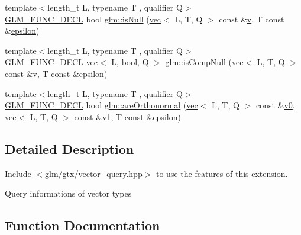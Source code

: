 \begin{DoxyCompactItemize}
\item 
{\footnotesize template$<$length\+\_\+t L, typename T , qualifier Q$>$ }\\\mbox{\hyperlink{setup_8hpp_ab2d052de21a70539923e9bcbf6e83a51}{G\+L\+M\+\_\+\+F\+U\+N\+C\+\_\+\+D\+E\+CL}} bool \mbox{\hyperlink{group__gtx__vector__query_gab4a3637dbcb4bb42dc55caea7a1e0495}{glm\+::is\+Null}} (\mbox{\hyperlink{structglm_1_1vec}{vec}}$<$ L, T, Q $>$ const \&\mbox{\hyperlink{_s_d_l__opengl_8h_a10a82eabcb59d2fcd74acee063775f90}{v}}, T const \&\mbox{\hyperlink{group__gtc__constants_ga2a1e57fc5592b69cfae84174cbfc9429}{epsilon}})
\item 
{\footnotesize template$<$length\+\_\+t L, typename T , qualifier Q$>$ }\\\mbox{\hyperlink{setup_8hpp_ab2d052de21a70539923e9bcbf6e83a51}{G\+L\+M\+\_\+\+F\+U\+N\+C\+\_\+\+D\+E\+CL}} \mbox{\hyperlink{structglm_1_1vec}{vec}}$<$ L, bool, Q $>$ \mbox{\hyperlink{group__gtx__vector__query_gaf6ec1688eab7442fe96fe4941d5d4e76}{glm\+::is\+Comp\+Null}} (\mbox{\hyperlink{structglm_1_1vec}{vec}}$<$ L, T, Q $>$ const \&\mbox{\hyperlink{_s_d_l__opengl_8h_a10a82eabcb59d2fcd74acee063775f90}{v}}, T const \&\mbox{\hyperlink{group__gtc__constants_ga2a1e57fc5592b69cfae84174cbfc9429}{epsilon}})
\item 
{\footnotesize template$<$length\+\_\+t L, typename T , qualifier Q$>$ }\\\mbox{\hyperlink{setup_8hpp_ab2d052de21a70539923e9bcbf6e83a51}{G\+L\+M\+\_\+\+F\+U\+N\+C\+\_\+\+D\+E\+CL}} bool \mbox{\hyperlink{group__gtx__vector__query_ga1b091c3d7f9ee3b0708311c001c293e3}{glm\+::are\+Orthonormal}} (\mbox{\hyperlink{structglm_1_1vec}{vec}}$<$ L, T, Q $>$ const \&\mbox{\hyperlink{_s_d_l__opengl__glext_8h_a7062a23d1d434121d4a88f530703d06a}{v0}}, \mbox{\hyperlink{structglm_1_1vec}{vec}}$<$ L, T, Q $>$ const \&\mbox{\hyperlink{_s_d_l__opengl__glext_8h_a435c176a02c061b43e19bdf7c86cceae}{v1}}, T const \&\mbox{\hyperlink{group__gtc__constants_ga2a1e57fc5592b69cfae84174cbfc9429}{epsilon}})
\end{DoxyCompactItemize}


\subsection{Detailed Description}
Include $<$\mbox{\hyperlink{vector__query_8hpp}{glm/gtx/vector\+\_\+query.\+hpp}}$>$ to use the features of this extension.

Query informations of vector types 

\subsection{Function Documentation}
\mbox{\label{group__gtx__vector__query_ga13da4a787a2ff70e95d561fb19ff91b4}} 
